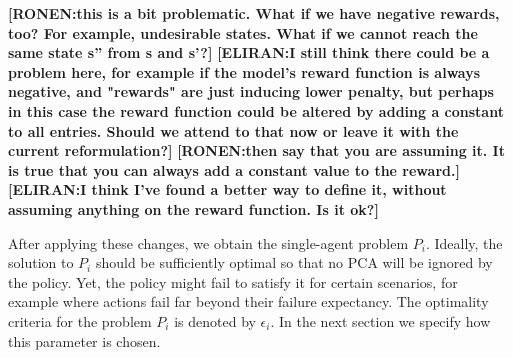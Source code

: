 \documentclass[letterpaper]{article} %
\theoremstyle{definition}
\newcommand{\eliran}[1]{\textbf{[\color{red}ELIRAN:#1]}}
\newcommand{\ronen}[1]{\textbf{[\color{blue}RONEN:#1]}}
\begin{document}
\begin{enumerate}
\ronen{this is a bit problematic. What if we have negative rewards, too?
For example, undesirable states. What if we cannot reach the same state s'' from s and s'?}
\eliran{I still think there could be a problem here, for example if the model's reward function is always negative, and "rewards" are just inducing lower penalty, but perhaps in this case the reward function could be altered by adding a constant to all entries. Should we attend to that now or leave it with the current reformulation?}
\ronen{then say that you are assuming it. It is true that you can always add a constant value to the reward.}\eliran{I think I've found a better way to define it, without assuming anything on the reward function. Is it ok?}
\end{enumerate}

After applying these changes, we obtain the single-agent problem $P_i$. %
Ideally, the solution to $P_i$ should be sufficiently optimal so that %
no PCA will be ignored by the policy. Yet, the policy might fail to satisfy it for certain scenarios, for example where actions fail far beyond their failure expectancy. The optimality criteria for the problem $P_i$ is denoted by $\epsilon_i$. In the next section we specify how this parameter is chosen.
\end{document}
